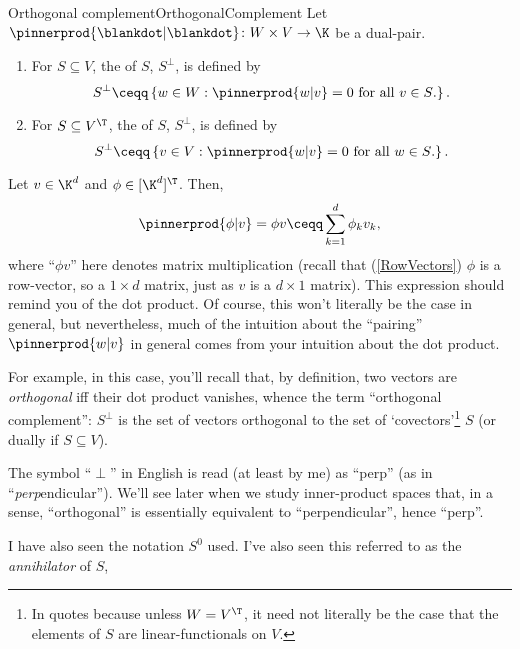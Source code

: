 \begin{dfn}{Orthogonal complement}{OrthogonalComplement}
	Let $\pinnerprod{\blankdot |\blankdot}\colon W\times V\rightarrow \K$ be a dual-pair.
	\begin{enumerate}
		\item For $S\subseteq V$, the  of $S$, $S^{\perp}$, is defined by
		\begin{equation}
		S^{\perp}\ceqq \left\{ w\in W:\pinnerprod{w|v}=0\text{ for all }v\in S\text{.}\right\} .
		\end{equation}
		\item For $S\subseteq V^{\T}$, the  of $S$, $S^{\perp}$, is defined by
		\begin{equation}
		S^{\perp}\ceqq \left\{ v\in V:\pinnerprod{w|v}=0\text{ for all }w\in S\text{.}\right\} .
		\end{equation}
	\end{enumerate}
	\begin{rmk}
		Let $v\in \K ^d$ and $\phi \in [\K ^d]^{\T}$.  Then,
		\begin{equation}
		\pinnerprod{\phi |v}=\phi v\ceqq \sum _{k=1}^d\phi _kv_k,
		\end{equation}
		where ``$\phi v$'' here denotes matrix multiplication (recall that (\cref{RowVectors}) $\phi$ is a row-vector, so a $1\times d$ matrix, just as $v$ is a $d\times 1$ matrix).  This expression should remind you of the dot product.  Of course, this won't literally be the case in general, but nevertheless, much of the intuition about the ``pairing'' $\pinnerprod{w|v}$ in general comes from your intuition about the dot product.
		
		For example, in this case, you'll recall that, by definition, two vectors are \emph{orthogonal} iff their dot product vanishes, whence the term ``orthogonal complement'':  $S^{\perp}$ is the set of vectors orthogonal to the set of `covectors'\footnote{In quotes because unless $W=V^{\T}$, it need not literally be the case that the elements of $S$ are linear-functionals on $V$.} $S$ (or dually if $S\subseteq V$).
	\end{rmk}
	\begin{rmk}
		The symbol ``$\perp$'' in English is read (at least by me) as ``perp'' (as in ``\emph{perp}endicular'').  We'll see later when we study inner-product spaces that, in a sense, ``orthogonal'' is essentially equivalent to ``perpendicular'', hence ``perp''.
	\end{rmk}
	\begin{rmk}
		I have also seen the notation $S^0$ used.  I've also seen this referred to as the \emph{annihilator} of $S$, 
	\end{rmk}
\end{dfn}
